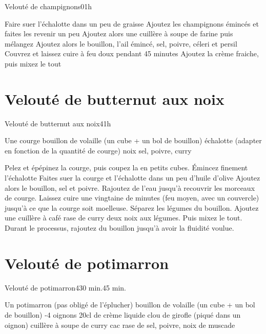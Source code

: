 {\begin{recette}{Velouté de champignons}{0}{1h}{}
\begin{preparation}
\etape Faire suer l'échalotte dans un peu de graisse
\etape Ajoutez les champignons émincés et faites les revenir un peu
\etape Ajoutez alors une cuillère à soupe de farine puis mélangez
\etape Ajoutez alors le bouillon, l'ail émincé, sel, poivre, céleri et persil
\etape Couvrez et laissez cuire à feu doux pendant 45 minutes
\etape Ajoutez la crème fraiche, puis mixez le tout
\end{preparation}
\end{recette}

\section{Velouté de butternut aux noix}
\begin{recette}{Velouté de butternut aux noix}{4}{1h}{}
\begin{ingredients}
\ingredient Une courge
\ingredient bouillon de volaille (un cube + un bol de bouillon)
 échalotte (adapter en fonction de la quantité de courge)
 noix
\ingredient sel, poivre, curry
\end{ingredients}

\begin{preparation}
\etape Pelez et épépinez la courge, puis coupez la en petits cubes. Émincez finement l'échalotte
\etape Faites suer la courge et l'échalotte dans un peu d'huile d'olive
\etape Ajoutez alors le bouillon, sel et poivre. Rajoutez de l'eau jusqu'à recouvrir les morceaux de courge. 
\etape Laissez cuire 
une vingtaine de minutes (feu moyen, avec un couvercle) jusqu'à ce que la courge soit moelleuse.
\etape Séparez les légumes du bouillon. 
\etape Ajoutez une cuillère à café rase de curry deux noix aux légumes. Puis mixez le tout. Durant le processus, rajoutez du 
bouillon jusqu'à avoir la fluidité voulue.
\end{preparation}
\end{recette}

\section{Velouté de potimarron}
\begin{recette}{Velouté de potimarron}{4}{30 min.}{45 min.}
\begin{ingredients}
\ingredient Un potimarron (pas obligé de l'éplucher)
\ingredient bouillon de volaille (un cube + un bol de bouillon)
-4 oignons
\ingredient 20cl de crème liquide
 clou de girofle (piqué dans un oignon)
 cuillère à soupe de curry
 cac rase de sel, poivre, noix de muscade
\end{ingredients}


\end{recette}}
